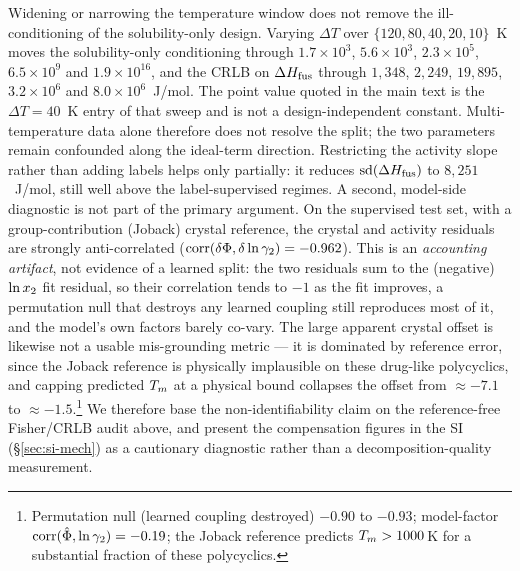 Widening or narrowing the temperature window does not remove the ill-conditioning of the solubility-only design. Varying $\Delta T$ over $\{120,80,40,20,10\}$~K moves the solubility-only conditioning through $1.7\times10^{3}$, $5.6\times10^{3}$, $2.3\times10^{5}$, $6.5\times10^{9}$ and $1.9\times10^{16}$, and the CRLB on $\Delta H_{\mathrm{fus}}$ through $1{,}348$, $2{,}249$, $19{,}895$, $3.2\times10^{6}$ and $8.0\times10^{6}$~J/mol. The point value quoted in the main text is the $\Delta T=40$~K entry of that sweep and is not a design-independent constant. Multi-temperature data alone therefore does not resolve the split; the two parameters remain confounded along the ideal-term direction. Restricting the activity slope rather than adding labels helps only partially: it reduces $\mathrm{sd}(\Delta H_{\mathrm{fus}})$ to $8{,}251$~J/mol, still well above the label-supervised regimes. A second, model-side diagnostic is not part of the primary argument. On the supervised test set, with a group-contribution (Joback) crystal reference, the crystal and activity residuals are strongly anti-correlated ($\mathrm{corr}(\delta\Phi,\delta\ln\gamma_2)=-0.962$). This is an \emph{accounting artifact}, not evidence of a learned split: the two residuals sum to the (negative) $\ln x_2$ fit residual, so their correlation tends to $-1$ as the fit improves, a permutation null that destroys any learned coupling still reproduces most of it, and the model's own factors barely co-vary. The large apparent crystal offset is likewise not a usable mis-grounding metric --- it is dominated by reference error, since the Joback reference is physically implausible on these drug-like polycyclics, and capping predicted $T_m$ at a physical bound collapses the offset from $\approx-7.1$ to $\approx-1.5$.\footnote{Permutation null (learned coupling destroyed) $-0.90$ to $-0.93$; model-factor $\mathrm{corr}(\hat\Phi,\ln\gamma_2)=-0.19$; the Joback reference predicts $T_m>1000$\,K for a substantial fraction of these polycyclics.} We therefore base the non-identifiability claim on the reference-free Fisher/CRLB audit above, and present the compensation figures in the SI (\S\ref{sec:si-mech}) as a cautionary diagnostic rather than a decomposition-quality measurement.
